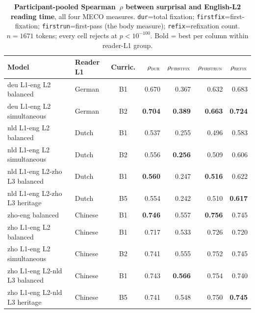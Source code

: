 \begin{table}[!ht]
  \centering \small
  \setlength{\tabcolsep}{4.5pt}
  \caption{\textbf{Participant-pooled Spearman~$\rho$ between \beetle{} surprisal and English-L2 reading time}, all four MECO measures. \texttt{dur}=total fixation; \texttt{firstfix}=first-fixation; \texttt{firstrun}=first-pass (the body measure); \texttt{refix}=refixation count. $n=1671$ tokens; every cell rejects at $p<10^{-100}$. Bold = best per column within reader-L1 group.}
  \label{tab:meco_english_l2_participants}
  \begin{tabular}{llcrrrr}
    \toprule
    Model & Reader L1 & Curric. & $\rho_\textsc{dur}$ & $\rho_\textsc{firstfix}$ & $\rho_\textsc{firstrun}$ & $\rho_\textsc{refix}$ \\
    \midrule
    deu L1-eng L2 balanced        & German  & B1 & 0.670 & 0.367 & 0.632 & 0.683 \\
    deu L1-eng L2 simultaneous    & German  & B2 & \textbf{0.704} & \textbf{0.389} & \textbf{0.663} & \textbf{0.724} \\
    \midrule
    nld L1-eng L2 balanced        & Dutch   & B1 & 0.537 & 0.255 & 0.496 & 0.583 \\
    nld L1-eng L2 simultaneous    & Dutch   & B2 & 0.556 & \textbf{0.256} & 0.509 & 0.606 \\
    nld L1-eng L2-zho L3 balanced & Dutch   & B1 & \textbf{0.560} & 0.247 & \textbf{0.516} & 0.622 \\
    nld L1-eng L2-zho L3 heritage & Dutch   & B5 & 0.554 & 0.242 & 0.510 & \textbf{0.617} \\
    \midrule
    zho-eng balanced              & Chinese & B1 & \textbf{0.746} & 0.557 & \textbf{0.756} & 0.745 \\
    zho L1-eng L2 balanced        & Chinese & B1 & 0.717 & 0.533 & 0.726 & 0.720 \\
    zho L1-eng L2 simultaneous    & Chinese & B2 & 0.741 & 0.555 & 0.752 & 0.745 \\
    zho L1-eng L2-nld L3 balanced & Chinese & B1 & 0.743 & \textbf{0.566} & 0.754 & 0.740 \\
    zho L1-eng L2-nld L3 heritage & Chinese & B5 & 0.741 & 0.548 & 0.750 & \textbf{0.745} \\
    \bottomrule
  \end{tabular}
\end{table}
 
 
 
 
